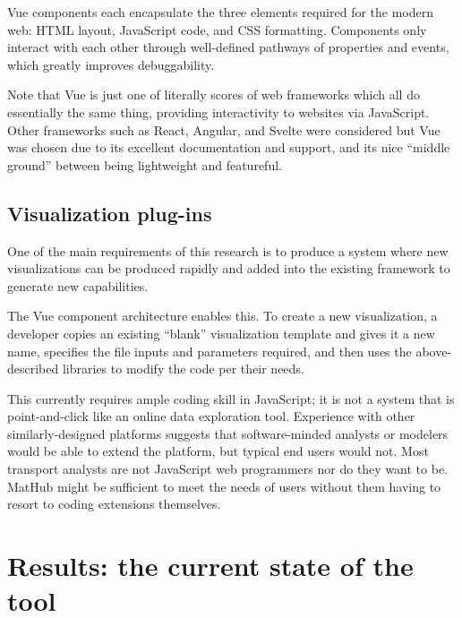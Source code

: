 Vue components each encapsulate the three elements required for the modern web: HTML layout, JavaScript code, and CSS formatting. Components only interact with each other through well-defined pathways of properties and events, which greatly improves debuggability.

Note that Vue is just one of literally scores of web frameworks which all do essentially the same thing, providing interactivity to websites via JavaScript. Other frameworks such as React, Angular, and Svelte were considered but Vue was chosen due to its excellent documentation and support, and its nice ``middle ground'' between being lightweight and featureful.

\hypertarget{mathub-visualization-plug-ins}{%
\subsection{Visualization plug-ins}\label{visualization-plug-ins}}

One of the main requirements of this research is to produce a system where new visualizations can be produced rapidly and added into the existing framework to generate new capabilities.

The Vue component architecture enables this. To create a new visualization, a developer copies an existing ``blank'' visualization template and gives it a new name, specifies the file inputs and parameters required, and then uses the above-described libraries to modify the code per their needs.

This currently requires ample coding skill in JavaScript; it is not a system that is point-and-click like an online data exploration tool. Experience with other similarly-designed platforms suggests that software-minded analysts or modelers would be able to extend the platform, but typical end users would not. Most transport analysts are not JavaScript web programmers nor do they want to be. MatHub might be sufficient to meet the needs of users without them having to resort to coding extensions themselves.

\hypertarget{mathub-results-the-current-state-of-the-tool}{%
\section{Results: the current state of the tool}\label{results-the-current-state-of-the-tool}}

